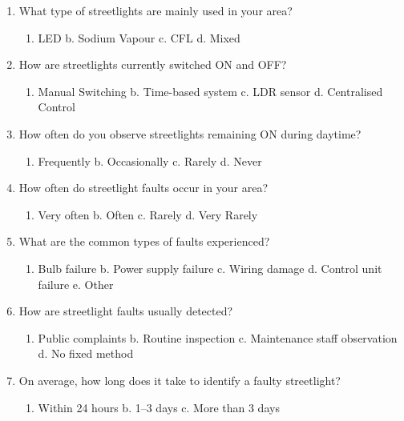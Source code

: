 \documentclass[12pt,a4paper]{article}
\begin{document}
\begin{enumerate}
    \item What type of streetlights are mainly used in your area?
    \begin{enumerate}[label=\alph*.]
        \item LED \quad b. Sodium Vapour \quad c. CFL \quad d. Mixed
    \end{enumerate}

    \item How are streetlights currently switched ON and OFF?
    \begin{enumerate}[label=\alph*.]
        \item Manual Switching \quad b. Time-based system \quad c. LDR sensor \quad d. Centralised Control
    \end{enumerate}

    \item How often do you observe streetlights remaining ON during daytime?
    \begin{enumerate}[label=\alph*.]
        \item Frequently \quad b. Occasionally \quad c. Rarely \quad d. Never
    \end{enumerate}

    \item How often do streetlight faults occur in your area?
    \begin{enumerate}[label=\alph*.]
        \item Very often \quad b. Often \quad c. Rarely \quad d. Very Rarely
    \end{enumerate}

    \item What are the common types of faults experienced?
    \begin{enumerate}[label=\alph*.]
        \item Bulb failure \quad b. Power supply failure \quad c. Wiring damage \quad d. Control unit failure \quad e. Other
    \end{enumerate}

    \item How are streetlight faults usually detected?
    \begin{enumerate}[label=\alph*.]
        \item Public complaints \quad b. Routine inspection \quad c. Maintenance staff observation \quad d. No fixed method
    \end{enumerate}

    \item On average, how long does it take to identify a faulty streetlight?
    \begin{enumerate}[label=\alph*.]
        \item Within 24 hours \quad b. 1--3 days \quad c. More than 3 days
    \end{enumerate}


\end{enumerate}
\end{document}
